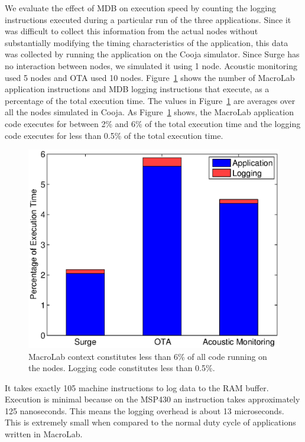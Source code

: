 We evaluate the effect of MDB on execution speed by counting the logging
instructions executed during a particular run of the three applications. Since
it was difficult to collect this information from the actual nodes without
substantially modifying the timing characteristics of the application, this data
was collected by running the application on the Cooja simulator. Since Surge has
no interaction between nodes, we simulated it using 1 node.  Acoustic monitoring
used 5 nodes and OTA used 10 nodes.  Figure~\ref{fig:execBreakdown} shows the
number of MacroLab application instructions and MDB logging instructions that
execute, as a percentage of the total execution time. The values in
Figure~\ref{fig:execBreakdown} are averages over all the nodes simulated in
Cooja. As Figure~\ref{fig:execBreakdown} shows, the MacroLab application code
executes for between 2\% and 6\% of the total execution time and the logging
code executes for less than 0.5\% of the total execution time.

\begin{figure}[t]
  \centering \includegraphics[scale=0.75]{fig/execBreakdown}
  \caption[CPU Overhead]{MacroLab context constitutes less than 6\% of all code running on
      the nodes. Logging code constitutes less than 0.5\%.}
  \label{fig:execBreakdown}
\end{figure}

It takes exactly 105 machine instructions to log data to the RAM buffer.
Execution is minimal because on the MSP430 an instruction takes approximately
125 nanoseconds.  This means the logging overhead is about 13 microseconds.
This is extremely small when compared to the normal duty cycle of applications
written in MacroLab.

